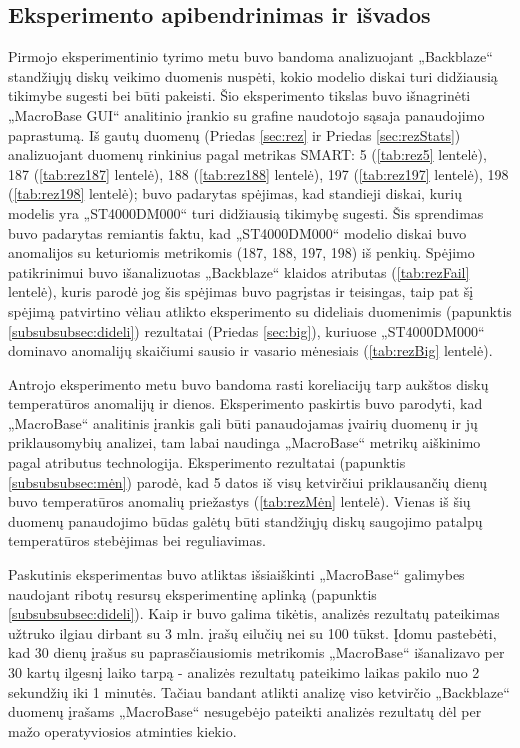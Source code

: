 \documentclass{VUMIFPSkursinis}
\begin{document}
\subsection{Eksperimento apibendrinimas ir išvados} \label{subsec:ExpApibendrinimas}
Pirmojo eksperimentinio tyrimo metu buvo bandoma analizuojant „Backblaze“ standžiųjų diskų veikimo duomenis nuspėti, kokio modelio diskai turi didžiausią tikimybe sugesti bei būti pakeisti. Šio eksperimento tikslas buvo išnagrinėti „MacroBase GUI“ analitinio įrankio su grafine naudotojo sąsaja panaudojimo paprastumą. Iš gautų duomenų (Priedas \ref{sec:rez} ir Priedas \ref{sec:rezStats}) analizuojant duomenų rinkinius pagal metrikas SMART: 5 (\ref{tab:rez5} lentelė), 187 (\ref{tab:rez187} lentelė), 188 (\ref{tab:rez188} lentelė), 197 (\ref{tab:rez197} lentelė), 198 (\ref{tab:rez198} lentelė); buvo padarytas spėjimas, kad standieji diskai, kurių modelis yra „ST4000DM000“ turi didžiausią tikimybę sugesti. Šis sprendimas buvo padarytas remiantis faktu, kad „ST4000DM000“ modelio diskai buvo anomalijos su keturiomis metrikomis (187, 188, 197, 198) iš penkių. Spėjimo patikrinimui buvo išanalizuotas „Backblaze“ klaidos atributas (\ref{tab:rezFail} lentelė), kuris parodė jog šis spėjimas buvo pagrįstas ir teisingas, taip pat šį spėjimą patvirtino vėliau atlikto eksperimento su dideliais duomenimis (papunktis \ref{subsubsubsec:dideli}) rezultatai (Priedas \ref{sec:big}), kuriuose „ST4000DM000“ dominavo anomalijų skaičiumi sausio ir vasario mėnesiais (\ref{tab:rezBig} lentelė).\par

Antrojo eksperimento metu buvo bandoma rasti koreliacijų tarp aukštos diskų temperatūros anomalijų ir dienos. Eksperimento paskirtis buvo parodyti, kad „MacroBase“ analitinis įrankis gali būti panaudojamas įvairių duomenų ir jų priklausomybių analizei, tam labai naudinga „MacroBase“ metrikų aiškinimo pagal atributus technologija. Eksperimento rezultatai (papunktis \ref{subsubsubsec:mėn}) parodė, kad 5 datos iš visų ketvirčiui priklausančių dienų buvo temperatūros anomalių priežastys (\ref{tab:rezMėn} lentelė). Vienas iš šių duomenų panaudojimo būdas galėtų būti standžiųjų diskų saugojimo patalpų  temperatūros stebėjimas bei reguliavimas. \par

Paskutinis eksperimentas buvo atliktas išsiaiškinti „MacroBase“ galimybes naudojant ribotų resursų eksperimentinę aplinką (papunktis \ref{subsubsubsec:dideli}). Kaip ir buvo galima tikėtis, analizės rezultatų pateikimas užtruko ilgiau dirbant su 3 mln. įrašų eilučių nei su 100 tūkst. Įdomu pastebėti, kad 30 dienų įrašus su paprasčiausiomis metrikomis „MacroBase“ išanalizavo per 30 kartų ilgesnį laiko tarpą - analizės rezultatų pateikimo laikas pakilo nuo 2 sekundžių iki 1 minutės. Tačiau bandant atlikti analizę viso ketvirčio „Backblaze“ duomenų įrašams „MacroBase“ nesugebėjo pateikti analizės rezultatų dėl per mažo operatyviosios atminties kiekio. \par
\end{document}
